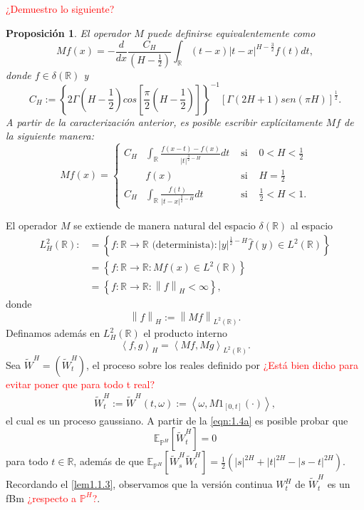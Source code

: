 \documentclass[letterpaper,12pt,oneside]{book}
\theoremstyle{plain}
\newtheorem{prop}[theorem]{Proposición}
\numberwithin{theorem}{section}
\begin{document}
\textcolor{red}{¿Demuestro lo siguiente?}
\begin{prop}
	El operador $M$ puede definirse equivalentemente como
	$$Mf(x)=-\frac{d}{dx}\frac{C_H}{(H-\frac{1}{2})}\int_{\mathbb R}(t-x)|t-x|^{H-\frac{3}{2}}f(t)dt,$$
	donde $f\in \delta (\mathbb R)$ y
	$$C_H:=\left\{2\Gamma\left(H-\frac{1}{2}\right)cos\left[\frac{\pi}{2}\left(H-\frac{1}{2}\right)\right]\right\}^{-1}\left[\Gamma(2H+1)sen(\pi H)\right]^{\frac{1}{2}}.$$
A partir de la caracterización anterior, es posible escribir explícitamente $Mf$ de la siguiente manera:
	$$Mf(x)=\left\{
		\begin{matrix}
			C_H &\displaystyle\int_{\mathbb R}\frac{f(x-t)-f(x)}{|t|^{\frac{3}{2}-H}}dt&\text{ si }&0<H<\frac{1}{2}\\
			&f(x)&\text{ si }&H=\frac{1}{2}\\
			C_H&\displaystyle\int_{\mathbb R} \frac{f(t)}{|t-x|^{\frac{3}{2}-H}}dt&\text{ si }&\frac{1}{2}<H<1.
		\end{matrix}
		\right.$$
\end{prop}
El operador $M$ se extiende de manera natural del espacio $\delta(\mathbb R)$ al espacio
\begin{align*}
	L^2_H(\mathbb R):&=\left\{f:\mathbb R\rightarrow \mathbb R \text{ (determinista)}:|y|^{\frac{1}{2}-H}\hat{f}(y)\in L^2(\mathbb R)\right\}\\
	&=\left\{f:\mathbb R\rightarrow \mathbb R :Mf(x)\in L^2(\mathbb R)\right\}\\
	&=\left\{f:\mathbb R\rightarrow \mathbb R :\left\|f\right\|_H<\infty\right\},
\end{align*}
donde
$$\left\|f\right\|_H:=\left\|Mf\right\|_{L^2(\mathbb R)}.$$
Definamos además en $L^2_H(\mathbb R)$ el producto interno
$$\left<f,g\right>_H=\left<Mf,Mg\right>_{L^2(\mathbb R)}.$$
Sea $\tilde W^H=(\tilde W^H_t)$, el proceso sobre los reales definido por \textcolor{red}{¿Está bien dicho para evitar poner que para todo t real?}
\begin{align}\label{eqn:1.4a}
\tilde W^H_t:=\tilde W^H(t,\omega):=\left<\omega,M1_{[0,t]}(\cdot)\right>,
\end{align}
el cual es un proceso gaussiano. A partir de la \cref{eqn:1.4a} es posible probar que $$\mathbb E_{\mathbb P^H}\left[\tilde W^H_t\right]=0$$ para todo $t\in\mathbb R$, además de que $\mathbb E_{\mathbb P^H}\left[\tilde W^H_s\tilde W^H_t\right]=\frac{1}{2}\left(|s|^{2H}+|t|^{2H}-|s-t|^{2H}\right)$. Recordando el \cref{lem1.1.3}, observamos que la versión continua $W^H_t$ de $\tilde W^H_t$ es un fBm \textcolor{red}{¿respecto a $\mathbb P^H$?}.
\end{document}
